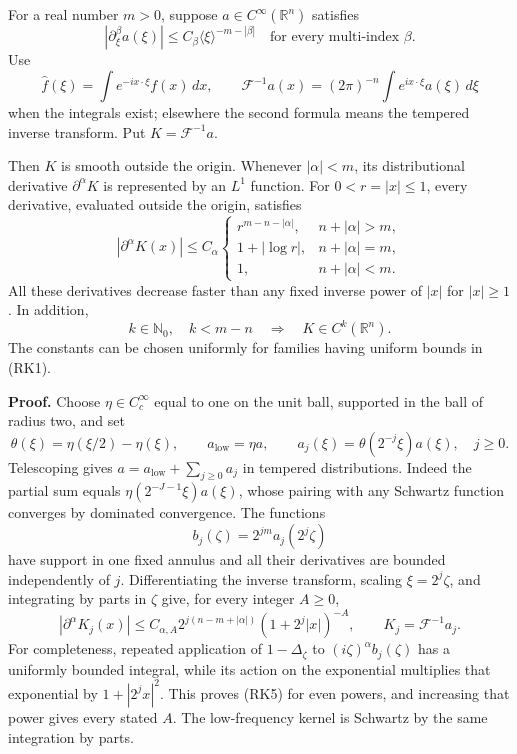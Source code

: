 \documentclass[
  11pt,
]{article}
\begin{document}
For a real number \(m>0\), suppose \(a\in C^\infty(\mathbb R^n)\)
satisfies \[
 |\partial_\xi^\beta a(\xi)|\leq C_\beta\langle\xi\rangle^{-m-|\beta|}
 \quad\text{for every multi-index }\beta.
 \tag{RK1}
\] Use \[
 \widehat f(\xi)=\int e^{-ix\cdot\xi}f(x)\,dx,\qquad
 \mathcal F^{-1}a(x)=(2\pi)^{-n}\int e^{ix\cdot\xi}a(\xi)\,d\xi
 \tag{RK2}
\] when the integrals exist; elsewhere the second formula means the
tempered inverse transform. Put \(K=\mathcal F^{-1}a\).

Then \(K\) is smooth outside the origin. Whenever \(|\alpha|<m\), its
distributional derivative \(\partial^\alpha K\) is represented by an
\(L^1\) function. For \(0<r=|x|\leq1\), every derivative, evaluated
outside the origin, satisfies \[
 |\partial^\alpha K(x)|\leq C_\alpha
 \begin{cases}
 r^{m-n-|\alpha|},&n+|\alpha|>m,\\
 1+|\log r|,&n+|\alpha|=m,\\
 1,&n+|\alpha|<m.
 \end{cases}
 \tag{RK3}
\] All these derivatives decrease faster than any fixed inverse power of
\(|x|\) for \(|x|\geq1\). In addition, \[
 k\in\mathbb N_0,\quad k<m-n
 \quad\Longrightarrow\quad K\in C^k(\mathbb R^n).
 \tag{RK4}
\] The constants can be chosen uniformly for families having uniform
bounds in (RK1).

\textbf{Proof.} Choose \(\eta\in C_c^\infty\) equal to one on the unit
ball, supported in the ball of radius two, and set \[
 \theta(\xi)=\eta(\xi/2)-\eta(\xi),\qquad
 a_{\mathrm{low}}=\eta a,\qquad
 a_j(\xi)=\theta(2^{-j}\xi)a(\xi),\quad j\geq0.
\] Telescoping gives \(a=a_{\mathrm{low}}+\sum_{j\geq0}a_j\) in tempered
distributions. Indeed the partial sum equals
\(\eta(2^{-J-1}\xi)a(\xi)\), whose pairing with any Schwartz function
converges by dominated convergence. The functions \[
 b_j(\zeta)=2^{jm}a_j(2^j\zeta)
\] have support in one fixed annulus and all their derivatives are
bounded independently of \(j\). Differentiating the inverse transform,
scaling \(\xi=2^j\zeta\), and integrating by parts in \(\zeta\) give,
for every integer \(A\geq0\), \[
 |\partial^\alpha K_j(x)|
 \leq C_{\alpha,A}2^{j(n-m+|\alpha|)}
                   (1+2^j|x|)^{-A},\qquad K_j=\mathcal F^{-1}a_j.
 \tag{RK5}
\] For completeness, repeated application of \(1-\Delta_\zeta\) to
\((i\zeta)^\alpha b_j(\zeta)\) has a uniformly bounded integral, while
its action on the exponential multiplies that exponential by
\(1+|2^jx|^2\). This proves (RK5) for even powers, and increasing that
power gives every stated \(A\). The low-frequency kernel is Schwartz by
the same integration by parts.
\end{document}
